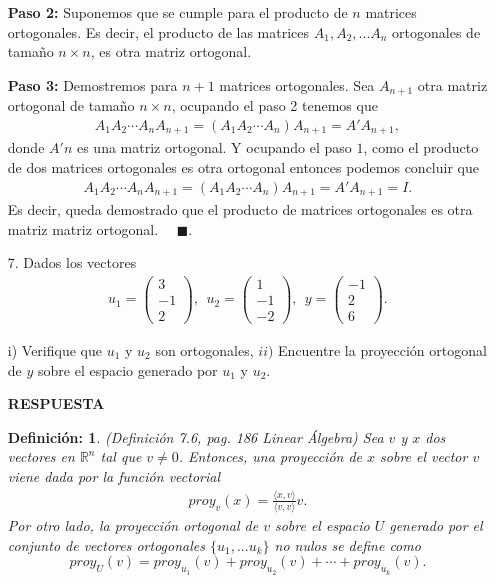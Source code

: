 \documentclass[11pt,letterpaper]{article}
\newcommand{\mR}{\mathbb{R}}
\newcommand{\res}{\textbf{RESPUESTA}\\}
\newcommand{\fin}{$\blacksquare.$}
\newtheorem{thmd}{Definición:}
\begin{document}
\begin{itemize}
\textbf{Paso 2:} Suponemos que se cumple para el producto de $n$ matrices ortogonales. Es decir, el producto de las matrices $A_1, A_2,...A_n$ ortogonales de tamaño $n\times n$, es otra matriz ortogonal.

\textbf{Paso 3:} Demostremos para $n+1$ matrices ortogonales. Sea $A_{n+1}$ otra matriz ortogonal de tamaño $n\times n$, ocupando el paso 2 tenemos que 
\begin{align*}
A_1A_2\cdots A_n A_{n+1}= (A_1A_2\cdots A_n)A_{n+1} = A'A_{n+1},
\end{align*}
donde $A'n$ es una matriz ortogonal. Y ocupando el paso $1$, como el producto de dos matrices ortogonales es otra ortogonal entonces podemos concluir que 
\begin{align*}
A_1A_2\cdots A_n A_{n+1}= (A_1A_2\cdots A_n)A_{n+1} = A'A_{n+1}= I.
\end{align*}
Es decir, queda demostrado que el producto de matrices ortogonales es otra matriz matriz ortogonal. \ \ \fin 


\item[7.] Dados los vectores
\begin{align*}
u_1=\begin{pmatrix} 3\\ -1 \\ 2 \end{pmatrix}, \ \ 
u_2=\begin{pmatrix} 1\\ -1 \\-2 \end{pmatrix}, \ \ 
y=\begin{pmatrix} -1\\ 2 \\ 6 \end{pmatrix}.
\end{align*}

i) Verifique que $u_1$ y $u_2$ son ortogonales, $ii)$ Encuentre la proyección ortogonal de $y$ sobre el espacio generado por $u_1$ y $u_2$.

\res \begin{framed}
    \begin{thmd} \label{d_proyeccion}
	(Definición 7.6, pag. 186 Linear Álgebra) Sea $v$ y $x$ dos vectores en $\mR^n$ tal que $v\neq 0$. Entonces, una proyección de $x$ sobre el vector $v$ viene dada por la función vectorial
	\begin{align*}
	proy_v(x)=\frac{\langle x, v \rangle}{\langle v,v \rangle} v.
	\end{align*}
	Por otro lado, la proyección ortogonal de $v$ sobre el
espacio $U$ generado por el conjunto de vectores ortogonales $\{u_1, . . . u_k\}$ no nulos se define como
$$proy_U (v) = proy_{u_1} (v) + proy_{u_2} (v) + \cdots + proy_{u_k} (v).$$
    \end{thmd}
\end{framed}


\end{itemize}
\end{document}
